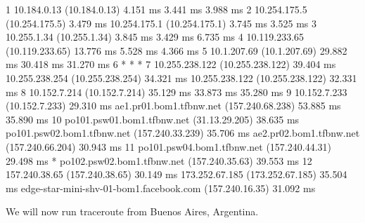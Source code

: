 \begin{enumerate}[a.]
\begin{code}
 1  10.184.0.13 (10.184.0.13)  4.151 ms  3.441 ms  3.988 ms
 2  10.254.175.5 (10.254.175.5)  3.479 ms
    10.254.175.1 (10.254.175.1)  3.745 ms  3.525 ms
 3  10.255.1.34 (10.255.1.34)  3.845 ms  3.429 ms  6.735 ms
 4  10.119.233.65 (10.119.233.65)  13.776 ms  5.528 ms  4.366 ms
 5  10.1.207.69 (10.1.207.69)  29.882 ms  30.418 ms  31.270 ms
 6  * * *
 7  10.255.238.122 (10.255.238.122)  39.404 ms
    10.255.238.254 (10.255.238.254)  34.321 ms
    10.255.238.122 (10.255.238.122)  32.331 ms
 8  10.152.7.214 (10.152.7.214)  35.129 ms  33.873 ms  35.280 ms
 9  10.152.7.233 (10.152.7.233)  29.310 ms
    ae1.pr01.bom1.tfbnw.net (157.240.68.238)  53.885 ms  35.890 ms
10  po101.psw01.bom1.tfbnw.net (31.13.29.205)  38.635 ms
    po101.psw02.bom1.tfbnw.net (157.240.33.239)  35.706 ms
    ae2.pr02.bom1.tfbnw.net (157.240.66.204)  30.943 ms
11  po101.psw04.bom1.tfbnw.net (157.240.44.31)  29.498 ms *
    po102.psw02.bom1.tfbnw.net (157.240.35.63)  39.553 ms
12  157.240.38.65 (157.240.38.65)  30.149 ms
    173.252.67.185 (173.252.67.185)  35.504 ms
    edge-star-mini-shv-01-bom1.facebook.com (157.240.16.35)  31.092 ms
\end{code}
\end{enumerate}
We will now run traceroute from Buenos Aires, Argentina.

